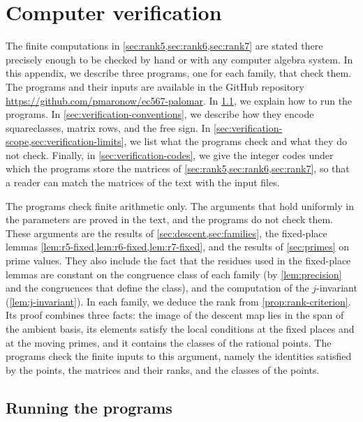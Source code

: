 \chapter{Computer verification}\label{app:verification}

The finite computations in \cref{sec:rank5,sec:rank6,sec:rank7} are stated there precisely enough to be checked by hand or with any computer algebra system. In this appendix, we describe three programs, one for each family, that check them. The programs and their inputs are available in the GitHub repository
\url{https://github.com/pmaronow/ec567-palomar}.
In \cref{sec:verification-running}, we explain how to run the programs. In \cref{sec:verification-conventions}, we describe how they encode squareclasses, matrix rows, and the free sign. In \cref{sec:verification-scope,sec:verification-limits}, we list what the programs check and what they do not check. Finally, in \cref{sec:verification-codes}, we give the integer codes under which the programs store the matrices of \cref{sec:rank5,sec:rank6,sec:rank7}, so that a reader can match the matrices of the text with the input files.

The programs check finite arithmetic only. The arguments that hold uniformly in the parameters are proved in the text, and the programs do not check them. These arguments are the results of \cref{sec:descent,sec:families}, the fixed-place lemmas \cref{lem:r5-fixed,lem:r6-fixed,lem:r7-fixed}, and the results of \cref{sec:primes} on prime values. They also include the fact that the residues used in the fixed-place lemmas are constant on the congruence class of each family (by \cref{lem:precision} and the congruences that define the class), and the computation of the $j$-invariant (\cref{lem:j-invariant}). In each family, we deduce the rank from \cref{prop:rank-criterion}. Its proof combines three facts: the image of the descent map lies in the span of the ambient basis, its elements satisfy the local conditions at the fixed places and at the moving primes, and it contains the classes of the rational points. The programs check the finite inputs to this argument, namely the identities satisfied by the points, the matrices and their ranks, and the classes of the points.

\section{Running the programs}\label{sec:verification-running}

